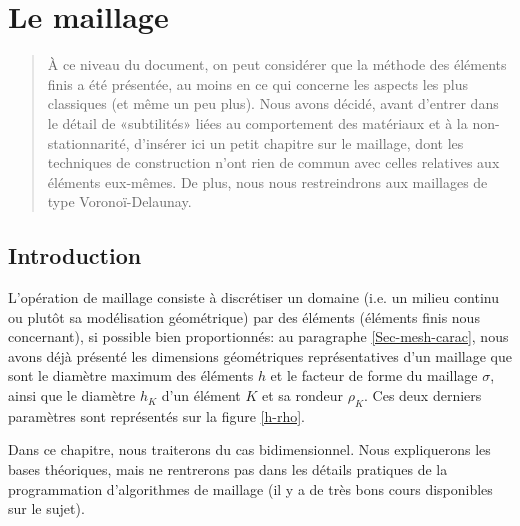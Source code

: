 \chapter{Le maillage}\label{Ch-mesh}
\begin{abstract}
À ce niveau du document, on peut considérer que la méthode des éléments finis a été présentée, au moins en ce qui concerne les aspects les plus classiques (et même un peu plus).
Nous avons décidé, avant d'entrer dans le détail de «subtilités» liées au comportement des matériaux et à la non-stationnarité, d'insérer ici un petit chapitre sur le maillage, dont les techniques de construction n'ont rien de commun avec celles relatives aux éléments eux-mêmes.
De plus, nous nous restreindrons aux maillages de type Voronoï-Delaunay.
\end{abstract}

\medskip
\section{Introduction}

L'opération de maillage consiste à discrétiser un domaine (i.e. un milieu continu ou plutôt sa modélisation géométrique) par des éléments 
(éléments finis nous concernant), si possible bien proportionnés: 
au paragraphe \ref{Sec-mesh-carac}, nous avons déjà présenté les dimensions géométriques représentatives d'un maillage que sont 
le diamètre maximum des éléments $h$ et le facteur de forme du maillage 
$\sigma$, ainsi que le diamètre $h_K$ d'un élément $K$ et sa rondeur $\rho_K$.
Ces deux derniers paramètres sont représentés sur la figure \ref{h-rho}. 

\medskip
Dans ce chapitre, nous traiterons du cas bidimensionnel.
Nous expliquerons les bases théoriques, mais ne rentrerons pas dans les détails pratiques de la programmation
d'algorithmes de maillage (il y a de très bons cours disponibles sur le sujet).

